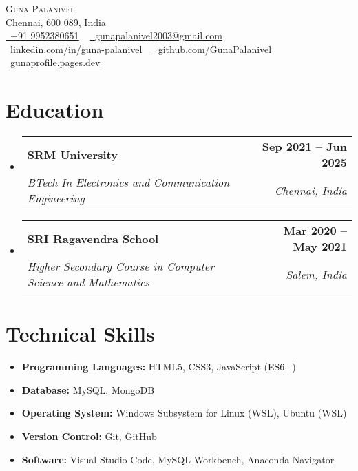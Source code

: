 \documentclass[letterpaper,11pt]{article}
\makeatletter
\newcommand{\resumeSubheading}[4]{
  \vspace{-2pt}\item
    \begin{tabular*}{1.0\textwidth}[t]{l@{\extracolsep{\fill}}r}
      \textbf{#1} & \textbf{\small #2} \\
      \textit{\small#3} & \textit{\small #4} \\
    \end{tabular*}\vspace{-7pt}
}
\newcommand{\resumeSubHeadingListStart}{\begin{itemize}[leftmargin=0.0in, label={}]}
\newcommand{\resumeSubHeadingListEnd}{\end{itemize}}
\makeatother
\begin{document}

\begin{center}
    {\Huge \scshape Guna Palanivel} \\ \vspace{1pt}
    Chennai, 600 089, India \\ \vspace{1pt}
     \href{tel:+919952380651}{\raisebox{-0.2\height}\faPhone\ \underline{+91 9952380651}} ~
    \href{mailto:gunapalanivel2003@gmail.com}{\raisebox{-0.2\height}\faEnvelope\ \underline{gunapalanivel2003@gmail.com}} \\
    \vspace{8pt} %
    \href{https://www.linkedin.com/in/guna-palanivel/}{\raisebox{-0.2\height}\faLinkedin\ \underline{linkedin.com/in/guna-palanivel}}  ~
    \href{https://github.com/GunaPalanivel}{\raisebox{-0.2\height}\faGithub\ \underline{github.com/GunaPalanivel}} ~
    \href{https://gunaprofile.pages.dev}{\raisebox{-0.2\height}\faGlobe\ \underline{gunaprofile.pages.dev}}
    \vspace{-8pt}
\end{center}





\section{Education}
  \resumeSubHeadingListStart
    \resumeSubheading
      {SRM University}{Sep 2021 -- Jun 2025}
      {BTech In Electronics and Communication Engineering}{Chennai, India}

      \resumeSubheading
      {SRI Ragavendra School}{Mar 2020 -- May 2021}
      {Higher Secondary Course in Computer Science and Mathematics}{Salem, India}
  \resumeSubHeadingListEnd


\section{Technical Skills}
\begin{itemize}[left=0pt, itemsep=-2pt]
    \item \textbf{Programming Languages:} HTML5, CSS3, JavaScript (ES6+)
    \item \textbf{Database:} MySQL, MongoDB
    \item \textbf{Operating System:} Windows Subsystem for Linux (WSL), Ubuntu (WSL)
    \item \textbf{Version Control:} Git, GitHub
    \item \textbf{Software:} Visual Studio Code, MySQL Workbench, Anaconda Navigator
\end{itemize}
\vspace{-16pt}
\end{document}
